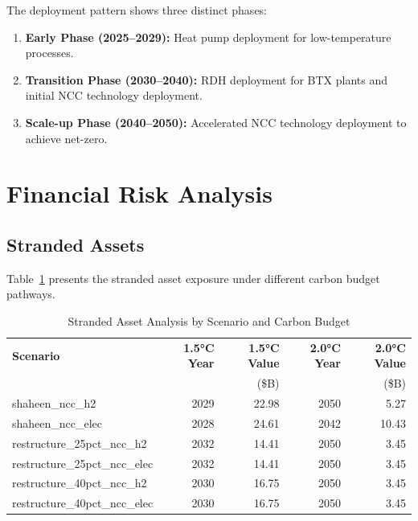 \documentclass[12pt,a4paper]{article}
\begin{document}
The deployment pattern shows three distinct phases:
\begin{enumerate}
\item \textbf{Early Phase (2025--2029):} Heat pump deployment for low-temperature processes.
\item \textbf{Transition Phase (2030--2040):} RDH deployment for BTX plants and initial NCC technology deployment.
\item \textbf{Scale-up Phase (2040--2050):} Accelerated NCC technology deployment to achieve net-zero.
\end{enumerate}

\section{Financial Risk Analysis}

\subsection{Stranded Assets}

Table~\ref{tab:stranded_assets} presents the stranded asset exposure under different carbon budget pathways.

\begin{table}[H]
\centering
\caption{Stranded Asset Analysis by Scenario and Carbon Budget}
\label{tab:stranded_assets}
\begin{tabular}{@{}lrrrr@{}}
\toprule
\textbf{Scenario} & \textbf{1.5°C Year} & \textbf{1.5°C Value} & \textbf{2.0°C Year} & \textbf{2.0°C Value} \\
 & & (\$B) & & (\$B) \\
\midrule
shaheen\_ncc\_h2 & 2029 & 22.98 & 2050 & 5.27 \\
shaheen\_ncc\_elec & 2028 & 24.61 & 2042 & 10.43 \\
restructure\_25pct\_ncc\_h2 & 2032 & 14.41 & 2050 & 3.45 \\
restructure\_25pct\_ncc\_elec & 2032 & 14.41 & 2050 & 3.45 \\
restructure\_40pct\_ncc\_h2 & 2030 & 16.75 & 2050 & 3.45 \\
restructure\_40pct\_ncc\_elec & 2030 & 16.75 & 2050 & 3.45 \\
\bottomrule
\end{tabular}
\end{table}
\end{document}
